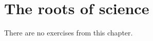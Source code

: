 \documentclass[../the-road-to-reality.tex]{subfiles}
\begin{document}
	
\section{The roots of science}

There are no exercises from this chapter.
\end{document}
